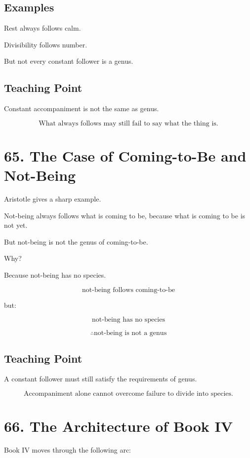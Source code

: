 \documentclass[12pt]{article}
\begin{document}
\subsection*{Examples}

Rest always follows calm.

Divisibility follows number.

But not every constant follower is a genus.

\subsection*{Teaching Point}

Constant accompaniment is not the same as genus.

\[
\boxed{
\text{What always follows may still fail to say what the thing is.}
}
\]

\section*{65. The Case of Coming-to-Be and Not-Being}

Aristotle gives a sharp example.

Not-being always follows what is coming to be, because what is coming to be is
not yet.

But not-being is not the genus of coming-to-be.

Why?

Because not-being has no species.

\[
\text{not-being follows coming-to-be}
\]

but:

\[
\text{not-being has no species}
\]

\[
\therefore \text{not-being is not a genus}
\]

\subsection*{Teaching Point}

A constant follower must still satisfy the requirements of genus.

\[
\boxed{
\text{Accompaniment alone cannot overcome failure to divide into species.}
}
\]

\section*{66. The Architecture of Book IV}

Book IV moves through the following arc:
\end{document}
